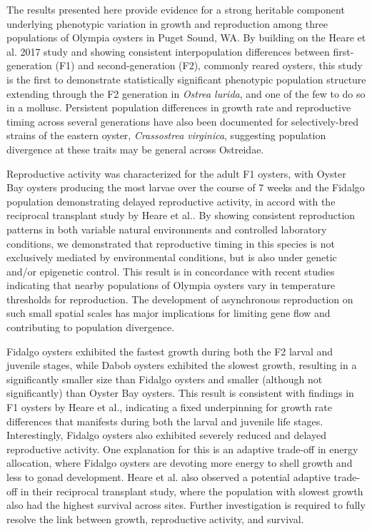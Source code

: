 \documentclass[fleqn,10pt]{wlscirep}
\begin{document}
The results presented here provide evidence for a strong heritable component underlying phenotypic variation in growth and reproduction among three populations of Olympia oysters in Puget Sound, WA. By building on the Heare et al. 2017 study and showing consistent interpopulation differences between first-generation (F1) and second-generation (F2), commonly reared oysters, this study is the first to demonstrate statistically significant phenotypic population structure extending through the F2 generation in \textit{Ostrea lurida}, and one of the few to do so in a mollusc. Persistent population differences in growth rate and reproductive timing across several generations have also been documented for selectively-bred strains of the eastern oyster, \textit{Crassostrea virginica}\cite{Dittman1998-xm,Barber1991-og}, suggesting population divergence at these traits may be general across Ostreidae. \par

Reproductive activity was characterized for the adult F1 oysters, with Oyster Bay oysters producing the most larvae over the course of 7 weeks and the Fidalgo population demonstrating delayed reproductive activity, in accord with the reciprocal transplant study by Heare et al.. By showing consistent reproduction patterns in both variable natural environments and controlled laboratory conditions, we demonstrated that reproductive timing in this species is not exclusively mediated by environmental conditions, but is also under genetic and/or epigenetic control. This result is in concordance with recent studies indicating that nearby populations of Olympia oysters vary in temperature thresholds for reproduction\cite{Barber2016-ws,Seale2009-uw}. The development of asynchronous reproduction on such small spatial scales has major implications for limiting gene flow and contributing to population divergence\cite{Palumbi1994-rv}.\par

Fidalgo oysters exhibited the fastest growth during both the F2 larval and juvenile stages, while Dabob oysters exhibited the slowest growth, resulting in a significantly smaller size than Fidalgo oysters and smaller (although not significantly) than Oyster Bay oysters. This result is consistent with findings in F1 oysters by Heare et al., indicating a fixed underpinning for growth rate differences that manifests during both the larval and juvenile life stages. Interestingly, Fidalgo oysters also exhibited severely reduced and delayed reproductive activity. One explanation for this is an adaptive trade-off in energy allocation\cite{Perrin1993-wa,Folkvord2014-jj}, where Fidalgo oysters are devoting more energy to shell growth and less to gonad development. Heare et al. also observed a potential adaptive trade-off in their reciprocal transplant study, where the population with slowest growth also had the highest survival across sites. Further investigation is required to fully resolve the link between growth, reproductive activity, and survival.\par
\end{document}
